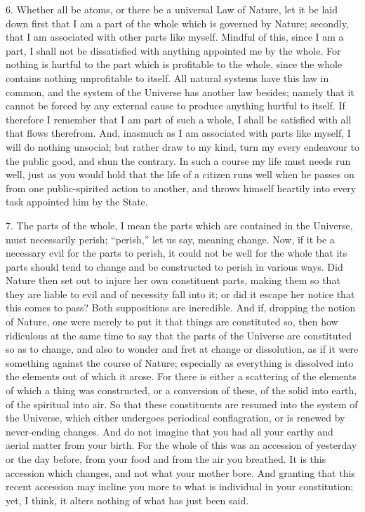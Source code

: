 \documentclass{book}
\begin{document}
6. Whether all be atoms, or there be a universal Law of Nature, let it
be laid down first that I am a part of the whole which is governed by
Nature; secondly, that I am associated with other parts like
myself. Mindful of this, since I am a part, I shall not be
dissatisfied with anything appointed me by the whole. For nothing is
hurtful to the part which is profitable to the whole, since the whole
contains nothing unprofitable to itself. All natural systems have this
law in common, and the system of the Universe has another law besides;
namely that it cannot be forced by any external cause to produce
anything hurtful to itself. If therefore I remember that I am part of
such a whole, I shall be satisfied with all that flows therefrom. And,
inasmuch as I am associated with parts like myself, I will do nothing
unsocial; but rather draw to my kind, turn my every endeavour to the
public good, and shun the contrary. In such a course my life must
needs run well, just as you would hold that the life of a citizen runs
well when he passes on from one public-spirited action to another, and
throws himself heartily into every task appointed him by the State.

7. The parts of the whole, I mean the parts which are contained in the
Universe, must necessarily perish; ``perish,'' let us say, meaning
change. Now, if it be a necessary evil for the parts to perish, it
could not be well for the whole that its parts should tend to change
and be constructed to perish in various ways. Did Nature then set out
to injure her own constituent parts, making them so that they are
liable to evil and of necessity fall into it; or did it escape her
notice that this comes to pass? Both suppositions are incredible. And
if, dropping the notion of Nature, one were merely to put it that
things are constituted so, then how ridiculous at the same time to say
that the parts of the Universe are constituted so as to change, and
also to wonder and fret at change or dissolution, as if it were
something against the course of Nature; especially as everything is
dissolved into the elements out of which it arose. For there is either
a scattering of the elements of which a thing was constructed, or a
conversion of these, of the solid into earth, of the spiritual into
air. So that these constituents are resumed into the system of the
Universe, which either undergoes periodical conflagration, or is
renewed by never-ending changes. And do not imagine that you had all
your earthy and aerial matter from your birth. For the whole of this
was an accession of yesterday or the day before, from your food and
from the air you breathed. It is this accession which changes, and not
what your mother bore. And granting that this recent accession may
incline you more to what is individual in your constitution; yet, I
think, it alters nothing of what has just been said.
\end{document}
